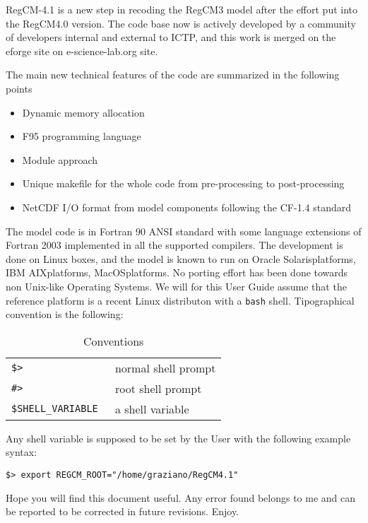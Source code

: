 %
%

RegCM-4.1 is a new step in recoding the RegCM3 model after the effort put into
the RegCM4.0 version. The code base now is actively developed by a community
of developers internal and external to ICTP, and this work is merged on the
eforge site on e-science-lab.org site.

The main new technical features of the code are summarized in the following
points

\begin{itemize}
\item Dynamic memory allocation
\item F95 programming language
\item Module approach
\item Unique makefile for the whole code from pre-processing to post-processing
\item NetCDF I/O format from model components following the CF-1.4 standard
\end{itemize}

The model code is in Fortran 90 ANSI standard with some language extensions of
Fortran 2003 implemented in all the supported compilers.
The development is done on Linux boxes, and the model is known to run
on Oracle Solaris\texttrademark platforms, IBM AIX\texttrademark platforms,
MacOS\texttrademark platforms.
No porting effort has been done towards non Unix-like Operating Systems.
We will for this User Guide assume that the reference platform is a recent
Linux distributon with a \verb=bash= shell.
Tipographical convention is the following:

\begin{table}[ht]
\caption{Conventions}
\vspace{0.05 in}
\centering
\begin{tabular}{l|l}
\hline
\verb=$> = & normal shell prompt \\
\verb=#> = & root shell prompt \\
\verb=$SHELL_VARIABLE = & a shell variable \\
\hline
\end{tabular}
\label{conventions}
\end{table}

Any shell variable is supposed to be set by the User with the following example
syntax:

\begin{Verbatim}
$> export REGCM_ROOT="/home/graziano/RegCM4.1"
\end{Verbatim}

Hope you will find this document useful. Any error found belongs to me and can
be reported to be corrected in future revisions. Enjoy.
